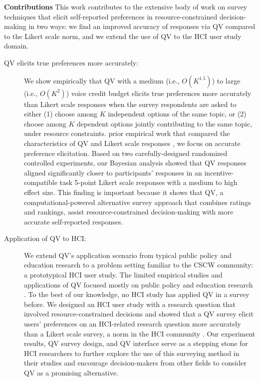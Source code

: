 \textbf{Contributions} This work contributes to the extensive body of work on survey techniques that elicit self-reported preferences in resource-constrained decision-making in two ways: we find an improved accuracy of responses via QV compared to the Likert scale norm, and we extend the use of QV to the HCI user study domain.

\begin{description}
\item[QV elicits true preferences more accurately:] We show empirically that QV with a medium (i.e., $O(K^{1.5})$) to large (i.e., $O(K^{2})$) voice credit budget elicits true preferences more accurately than Likert scale responses when the survey respondents are asked to either (1) choose among $K$ independent options of the same topic, or (2) choose among $K$ dependent options jointly contributing to the same topic, under resource constraints.  prior empirical work that compared the characteristics of QV and Likert scale responses \cite{quarfoot2017quadratic, naylor2017first}, we focus on accurate preference elicitation. Based on two carefully-designed randomized controlled experiments, our Bayesian analysis showed that QV responses aligned significantly closer to participants' responses in an incentive-compatible task  5-point Likert scale responses with a medium to high effect size. This finding is important because it shows that QV, a computational-powered alternative survey approach that combines ratings and rankings,  assist resource-constrained decision-making with more accurate self-reported responses.
\item[Application of QV to HCI:] We extend QV's application scenario from typical public policy and education research to a problem setting familiar to the CSCW community: a prototypical HCI user study. The limited empirical studies and applications of QV focused mostly on public policy \cite{quarfoot2017quadratic, colorado_qv} and education research \cite{naylor2017first}. To the best of our knowledge, no HCI study has applied QV in a survey before. We designed an HCI user study with a research question that involved resource-constrained decisions and showed that a QV survey  elicit users' preferences on an HCI-related research question more accurately than a Likert scale survey, a norm in the HCI community \cite{ledo2018evaluation}. Our experiment results, QV survey design, and QV interface serve as a stepping stone for HCI researchers to further explore the use of this surveying method in their studies and encourage decision-makers from other fields to consider QV as a promising alternative.
\end{description}

